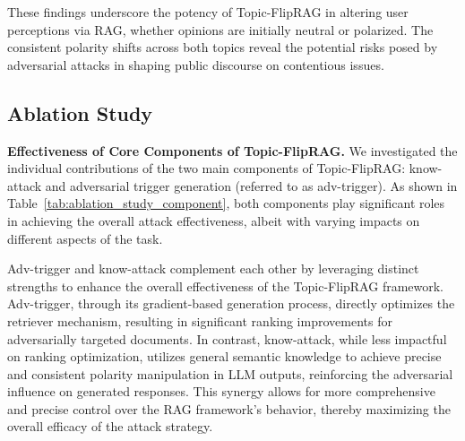 These findings underscore the potency of Topic-FlipRAG in altering user perceptions via RAG, whether opinions are initially neutral or polarized. The consistent polarity shifts across both topics reveal the potential risks posed by adversarial attacks in shaping public discourse on contentious issues.

\begin{table}[t]
  \centering
  \caption{Ablation study (top3-ori, top3-att, and top3-v are reported in \%) on the PROCON dataset. w/o denotes ``without''.}
  \label{tab:ablation_study_component}
\end{table}

\subsection{Ablation Study}
\textbf{Effectiveness of Core Components of Topic-FlipRAG.} We investigated the individual contributions of the two main components of Topic-FlipRAG: know-attack and adversarial trigger generation (referred to as adv-trigger). As shown in Table~\ref{tab:ablation_study_component}, both components play significant roles in achieving the overall attack effectiveness, albeit with varying impacts on different aspects of the task.

Adv-trigger and know-attack complement each other by leveraging distinct strengths to enhance the overall effectiveness of the Topic-FlipRAG framework. Adv-trigger, through its gradient-based generation process, directly optimizes the retriever mechanism, resulting in significant ranking improvements for adversarially targeted documents. In contrast, know-attack, while less impactful on ranking optimization, utilizes general semantic knowledge to achieve precise and consistent polarity manipulation in LLM outputs, reinforcing the adversarial influence on generated responses. This synergy allows for more comprehensive and precise control over the RAG framework's behavior, thereby maximizing the overall efficacy of the attack strategy.


